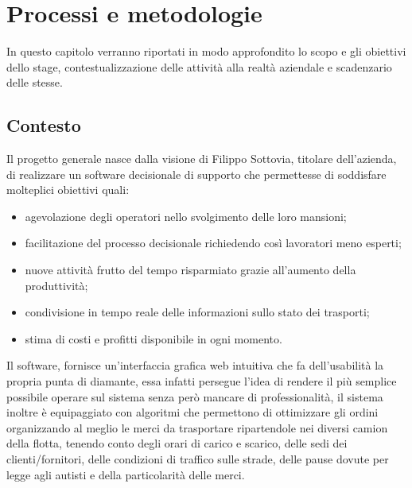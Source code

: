 
\hypertarget{(chap:capitolo2)}{}
\chapter{Processi e metodologie}
In questo capitolo verranno riportati in modo approfondito lo scopo e gli obiettivi dello stage, contestualizzazione delle attività alla realtà aziendale e scadenzario delle stesse.

\section{Contesto}
Il progetto generale nasce dalla visione di Filippo Sottovia, titolare dell'azienda, di realizzare un software decisionale di supporto che permettesse di soddisfare molteplici obiettivi quali:
\begin{itemize}
	\item agevolazione degli operatori nello svolgimento delle loro mansioni;
	\item facilitazione del processo decisionale richiedendo così lavoratori meno esperti;
	\item nuove attività frutto del tempo risparmiato grazie all'aumento della produttività;
	\item condivisione in tempo reale delle informazioni sullo stato dei trasporti;
	\item stima di costi e profitti disponibile in ogni momento.
\end{itemize}

Il software, fornisce un'interfaccia grafica web intuitiva che fa dell'usabilità la propria punta di diamante, essa infatti persegue l'idea di rendere il più semplice possibile operare sul sistema senza però mancare di professionalità, il sistema inoltre è equipaggiato con algoritmi che permettono di ottimizzare gli ordini organizzando al meglio le merci da trasportare ripartendole nei diversi camion della flotta, tenendo conto degli orari di carico e scarico, delle sedi dei clienti/fornitori, delle condizioni di traffico sulle strade, delle pause dovute per legge agli autisti e della particolarità delle merci.

